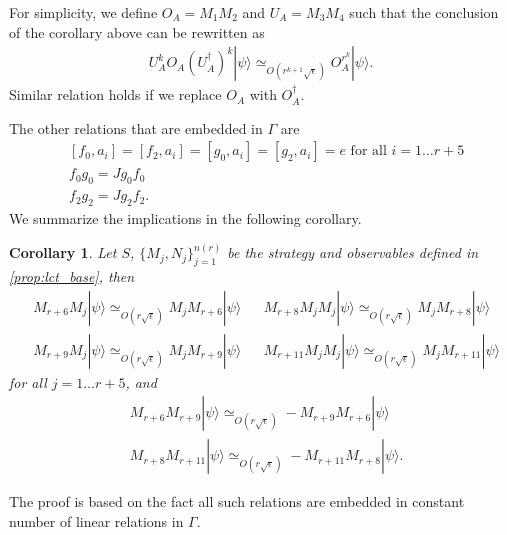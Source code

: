 \documentclass[11pt,letterpaper]{article}
\newcommand{\ket}[1]{|#1\rangle}
\newcommand{\ct}{^{\dagger}}
\newcommand{\1}{\mathbb{1}}
\newcommand{\nr}{n(r)}
\newcommand{\se}{\sqrt{\epsilon}}
\newcommand{\appd}[1]{\simeq_{#1}}
\newtheorem{corollary}[theorem]{Corollary}
\theoremstyle{definition}
\begin{document}
For simplicity, we define $O_A = M_1M_2$ and $U_A=M_3M_4$ such that
the conclusion of the corollary above can be rewritten as 
\begin{align}
	U_A^k O_A (U_A\ct)^k \ket{\psi} \appd{O(r^{k+1} \se)} O_A^{r^k} \ket{\psi}.
\end{align}
Similar relation holds if we replace $O_A$ with $O_A\ct$.

The other relations that are embedded in $\Gamma$ are 
\begin{align}
	&[f_0, a_i] = [f_2, a_i] = [g_0, a_i] = [g_2, a_i] = e \text{ for all } i = 1 \dots r+5 \\
	&f_0g_0 = Jg_0f_0 \\
	&f_2g_2 = J g_2 f_2.
\end{align}
We summarize the implications in the following corollary.
\begin{corollary}
	\label{cor:lct_comm}
	Let $S$, $\{M_j, N_j\}_{j=1}^{\nr}$ be the strategy and observables defined in \cref{prop:lct_base},
	then
	\begin{align}
		&M_{r+6} M_j \ket{\psi} \appd{O(r\se)} M_j M_{r+6} \ket{\psi} && 
		M_{r+8}M_jM_j \ket{\psi} \appd{O(r\se)} M_j M_{r+8} \ket{\psi} \\
		&M_{r+9} M_j \ket{\psi} \appd{O(r\se)} M_j M_{r+9} \ket{\psi} && 
		M_{r+11}M_jM_j \ket{\psi} \appd{O(r\se)} M_j M_{r+11} \ket{\psi} 
	\end{align}
	for all $j = 1 \dots r+5$, and
	\begin{align}
		&M_{r+6}M_{r+9} \ket{\psi} \appd{O(r\se)} - M_{r+9}M_{r+6} \ket{\psi} \\
		&M_{r+8}M_{r+11} \ket{\psi} \appd{O(r\se)} -M_{r+11}M_{r+8} \ket{\psi}.
	\end{align}
\end{corollary}
The proof is based on the fact all such relations are embedded in constant number of linear relations in $\Gamma$.
\end{document}
